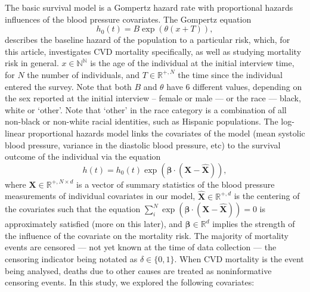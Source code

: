 \documentclass[
]{article}
\begin{document}
The basic survival model is a Gompertz hazard rate with proportional
hazards influences of the blood pressure covariates. The Gompertz
equation \begin{equation}\label{gompertz}
h_0(t)=B\exp{\left(\theta(x+T)\right)},
\end{equation} describes the baseline hazard of the population to a
particular risk, which, for this article, investigates CVD mortality
specifically, as well as studying mortality risk in general.
\(x\in\mathbb{N^N}\) is the age of the individual at the initial
interview time, for \(N\) the number of individuals, and
\(T\in\mathbb{R}^{+,N}\) the time since the individual entered the
survey. Note that both \(B\) and \(\theta\) have 6 different values,
depending on the sex reported at the initial interview -- female or male
--- or the race --- black, white or `other'. Note that `other' in the
race category is a combination of all non-black or non-white racial
identities, such as Hispanic populations. The log-linear proportional
hazards model links the covariates of the model (mean systolic blood
pressure, variance in the diastolic blood pressure, etc) to the survival
outcome of the individual via the equation
\begin{equation}\label{prophaz}
h(t)=h_0(t)\exp{\left(\boldsymbol{\beta}\cdot(\boldsymbol{X}-\hat{\boldsymbol{X}})\right)},
\end{equation} where \(\boldsymbol{X}\in\mathbb{R}^{+,N\times d}\) is a
vector of summary statistics of the blood pressure measurements of
individual covariates in our model,
\(\hat{\boldsymbol{X}}\in\mathbb{R}^{+,d}\) is the centering of the
covariates such that the equation
\(\sum_i^N \exp{(\boldsymbol{\beta}\cdot(\boldsymbol{X}-\hat{\boldsymbol{X}}))}=0\)
is approximately satisfied (more on this later), and
\(\boldsymbol{\beta}\in\mathbb{R}^d\) implies the strength of the
influence of the covariate on the mortality risk. The majority of
mortality events are censored --- not yet known at the time of data
collection --- the censoring indicator being notated as
\(\delta\in \{0,1\}\). When CVD mortality is the event being analysed,
deaths due to other causes are treated as noninformative censoring
events. In this study, we explored the following covariates:
\end{document}

